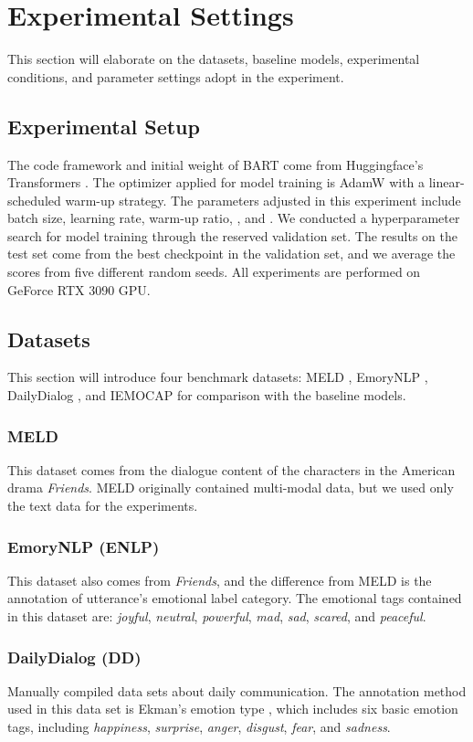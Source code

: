 \documentclass[letterpaper]{article} \usepackage{aaai22}  \usepackage{times}  \usepackage{helvet}  \usepackage{courier}  \usepackage[hyphens]{url}  \usepackage{graphicx} \urlstyle{rm} \def\UrlFont{\rm}  \usepackage{natbib}  \usepackage{caption} \DeclareCaptionStyle{ruled}{labelfont=normalfont,labelsep=colon,strut=off} \frenchspacing  \setlength{\pdfpagewidth}{8.5in}  \setlength{\pdfpageheight}{11in}  \usepackage{algorithm}
\begin{document}
\section{Experimental Settings}
This section will elaborate on the datasets, baseline models, experimental conditions, and parameter settings adopt in the experiment.
\subsection{Experimental Setup}
The code framework and initial weight of BART come from Huggingface's Transformers \cite{wolf-etal-2020-transformers}. The optimizer applied for model training is AdamW with a linear-scheduled warm-up strategy. The parameters adjusted in this experiment include batch size, learning rate, warm-up ratio, , and . We conducted a hyperparameter search for model training through the reserved validation set. The results on the test set come from the best checkpoint in the validation set, and we average the scores from five different random seeds. All experiments are performed on GeForce RTX 3090 GPU.

\subsection{Datasets}
This section will introduce four benchmark datasets: MELD \cite{poria-etal-2019-meld}, EmoryNLP \cite{emorynlp}, DailyDialog \cite{li-etal-2017-dailydialog}, and IEMOCAP \cite{busso2008iemocap} for comparison with the baseline models.
\subsubsection{MELD}
This dataset comes from the dialogue content of the characters in the American drama \textit{Friends}. MELD originally contained multi-modal data, but we used only the text data for the experiments.
\subsubsection{EmoryNLP (ENLP)}
This dataset also comes from \textit{Friends}, and the difference from MELD is the annotation of utterance's emotional label category. The emotional tags contained in this dataset are: \textit{joyful}, \textit{neutral}, \textit{powerful}, \textit{mad}, \textit{sad}, \textit{scared}, and \textit{peaceful}.
\subsubsection{DailyDialog (DD)}
Manually compiled data sets about daily communication. The annotation method used in this data set is Ekman's emotion type \cite{ekman1993facial}, which includes six basic emotion tags, including \textit{happiness}, \textit{surprise}, \textit{anger}, \textit{disgust}, \textit{fear}, and \textit{sadness}.
\end{document}
